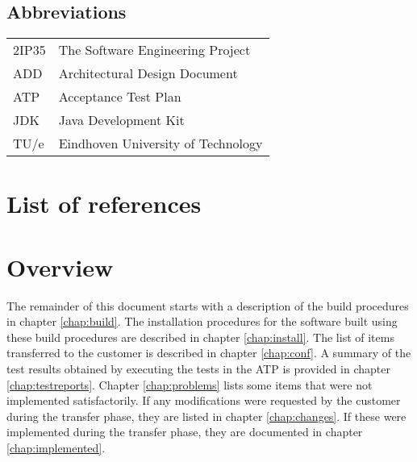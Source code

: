 \subsection{Abbreviations}
\begin{tabular}{l|l}
2IP35 & The Software Engineering Project \\
ADD & Architectural Design Document \\
ATP & Acceptance Test Plan \\
JDK & Java Development Kit \\
TU/e  & Eindhoven University of Technology \\
\end{tabular}

\section{List of references}


\section{Overview}
The remainder of this document starts with a description of the build procedures in chapter \ref{chap:build}. The installation procedures for the software built using these build procedures are described in chapter \ref{chap:install}. The list of items transferred to the customer is described in chapter \ref{chap:conf}. A summary of the test results obtained by executing the tests in the ATP \cite{atp} is provided in chapter \ref{chap:testreports}. Chapter \ref{chap:problems} lists some items that were not implemented satisfactorily. If any modifications were requested by the customer during the transfer phase, they are listed in chapter \ref{chap:changes}. If these were implemented during the transfer phase, they are documented in chapter \ref{chap:implemented}.